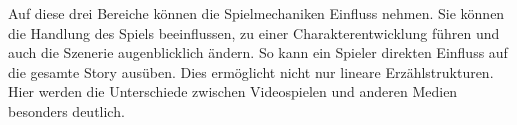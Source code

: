 Auf diese drei Bereiche können die Spielmechaniken Einfluss nehmen. Sie können die Handlung des Spiels beeinflussen, zu einer Charakterentwicklung führen und auch die Szenerie augenblicklich ändern. So kann ein Spieler direkten Einfluss auf die gesamte Story ausüben. Dies ermöglicht nicht nur lineare Erzählstrukturen. Hier werden die Unterschiede zwischen Videospielen und anderen Medien besonders deutlich. 
